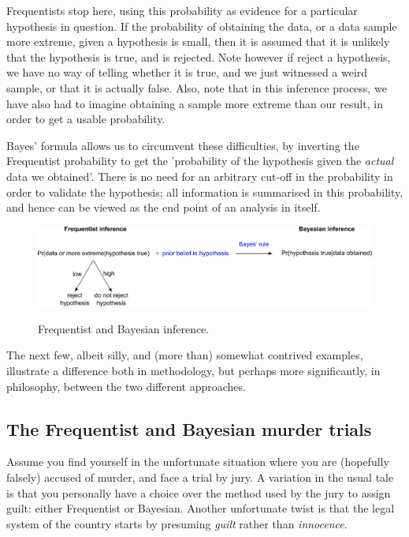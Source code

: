 \documentclass[11pt,fullpage]{book}
\begin{document}
Frequentists stop here, using this probability as evidence for a particular hypothesis in question. If the probability of obtaining the data, or a data sample more extreme, given a hypothesis is small, then it is assumed that it is unlikely that the hypothesis is true, and is rejected. Note however if reject a hypothesis, we have no way of telling whether it is true, and we just witnessed a weird sample, or that it is actually false. Also, note that in this inference process, we have also had to imagine obtaining a sample more extreme than our result, in order to get a usable probability. 

Bayes' formula allows us to circumvent these difficulties, by inverting the Frequentist probability to get the 'probability of the hypothesis given the \textit{actual} data we obtained'. There is no need for an arbitrary cut-off in the probability in order to validate the hypothesis; all information is summarised in this probability, and hence can be viewed as the end point of an analysis in itself.

\begin{figure}
\centering
\scalebox{0.4} 
{\includegraphics{Intro_BayesVsFrequentist.pdf}}
\caption{Frequentist and Bayesian inference.}\label{fig:Intro_BayesVsFrequentist}
\end{figure}

The next few, albeit silly, and (more than) somewhat contrived examples, illustrate a difference both in methodology, but perhaps more significantly, in philosophy, between the two different approaches.

\subsection{The Frequentist and Bayesian murder trials}
Assume you find yourself in the unfortunate situation where you are (hopefully falsely) accused of murder, and face a trial by jury. A variation in the usual tale is that you personally have a choice over the method used by the jury to assign guilt: either Frequentist or Bayesian. Another unfortunate twist is that the legal system of the country starts by presuming \textit{guilt} rather than \textit{innocence}.
\end{document}
